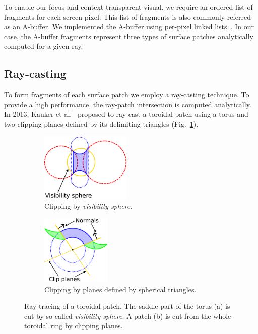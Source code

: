 \label{sec:vis}

To enable our focus and context transparent visual, we require an ordered list of fragments for each screen pixel. This list of fragments is also commonly referred as an A-buffer. We implemented the A-buffer using per-pixel linked lists~\cite{yang2010real}. In our case, the A-buffer fragments represent three types of surface patches analytically computed for a given ray.

\subsection{Ray-casting}
\label{sec:spherical-patches}
To form fragments of each surface patch we employ a ray-casting technique. To provide a high performance, the ray-patch intersection is computed analytically.
In 2013, Kauker et al.~\cite{kauker2013rendering} proposed to ray-cast a toroidal patch using a torus and two clipping planes defined by its delimiting triangles (Fig.~\ref{fig:torus-vs}).
\begin{figure}[htp]
  \centering
  \begin{subfigure}[t]{0.55\columnwidth}
    \centering
    \includegraphics[width=1.7in]{image/torus-vs.png}
    \caption{Clipping by \textit{visibility sphere}.}
		\label{fig:torus-vs}
  \end{subfigure}%
  \quad
  \begin{subfigure}[t]{0.4\columnwidth}
    \centering
    \includegraphics[width=1.3in]{image/torus-planes.png}
    \caption{Clipping by planes defined by spherical triangles.}
  \end{subfigure}
\caption{Ray-tracing of a toroidal patch. The saddle part of the torus (a) is cut by so called \textit{visibility sphere}.
A patch (b) is cut from the whole toroidal ring by clipping planes.}
\end{figure}

